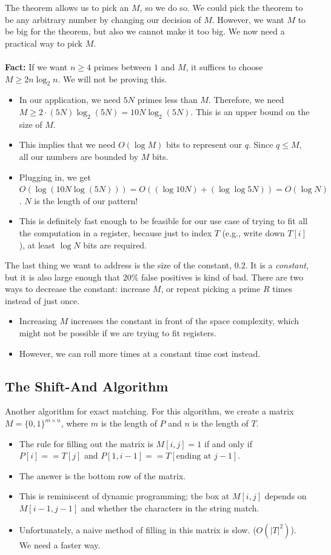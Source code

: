 \documentclass[10pt]{article}
\begin{document}
The theorem allows us to pick an $M$, so we do so.  We could pick the theorem to be any arbitrary number by changing our decision of $M$.  However, we want $M$ to be big for the theorem, but also we cannot make it too big.  We now need a practical way to pick $M$.\\\\
\textbf{Fact:} If we want $n \geq 4$ primes between $1$ and $M$, it suffices to choose $M \geq 2n \log_2 n$.  We will not be proving this.
\begin{itemize}
	\item In our application, we need $5N$ primes less than $M$.  Therefore, we need $M \geq 2 \cdot (5N) \log_2 (5N) = 10N \log_2 (5N)$.  This is an upper bound on the size of $M$.
	\item This implies that we need $O(\log M)$ bits to represent our $q$.  Since $q \leq M$, all our numbers are bounded by $M$ bits.
	\item Plugging in, we get $O(\log(10 N \log (5N))) = O((\log 10N) + (\log \log 5N)) = O(\log N)$.  $N$ is the length of our pattern!
	\item This is definitely fast enough to be feasible for our use case of trying to fit all the computation in a register, because just to index $T$ (e.g., write down $T[i]$), at least $\log N$ bits are required.
\end{itemize}
The last thing we want to address is the size of the constant, $0.2$.  It is a \textit{constant}, but it is also large enough that $20\%$ false positives is kind of bad.  There are two ways to decrease the constant: increase $M$, or repeat picking a prime $R$ times instead of just once.
\begin{itemize}
	\item Increasing $M$ increases the constant in front of the space complexity, which might not be possible if we are trying to fit registers.
	\item However, we can roll more times at a constant time cost instead.
\end{itemize}

\subsection*{The Shift-And Algorithm}
Another algorithm for exact matching.  For this algorithm, we create a matrix $M = \{0, 1\}^{m \times n}$, where $m$ is the length of $P$ and $n$ is the length of $T$.  
\begin{itemize}
	\item The rule for filling out the matrix is $M[i, j] = 1$ if and only if $P[i] == T[j]$ and $P[1, i - 1] == T[\text{ending at }j - 1]$.
	\item The answer is the bottom row of the matrix.
	\item This is reminiscent of dynamic programming; the box at $M[i, j]$ depends on $M[i - 1, j - 1]$ and whether the characters in the string match.
	\item Unfortunately, a naive method of filling in this matrix is slow.  ($O(|T|^2)$).  We need a faster way.
\end{itemize}
\end{document}
